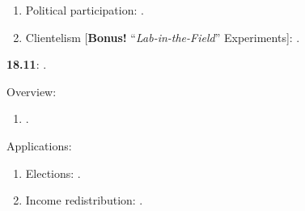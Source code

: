 \documentclass[letterpaper]{article}
\renewenvironment{itemize}{
  \begin{list}{}{
    \setlength{\leftmargin}{1.5em}
  }
}{
  \end{list}
}
\begin{document}
\begin{enumerate}
\begin{itemize}
\begin{enumerate}
           
          \item[$\bullet$] Political participation: \href{https://onlinelibrary.wiley.com/doi/pdf/10.1111/j.1540-5907.2008.00332.x}{}.

          \item[$\bullet$] Clientelism [{\bf Bonus!} ``\emph{Lab-in-the-Field}'' Experiments]: \href{https://doi.org/10.1177/0010414017695336}{}.


         \end{enumerate}

      \end{itemize}

  \item {\bf 18.11}:  {\color{ForestGreen}{\bf Natural Experiments}}.


      \begin{itemize} 

        \item[$\diamond$] Overview:

        \begin{enumerate}

          \item[$\bullet$] \href{https://www.cambridge.org/core/product/identifier/9781108777919%23c6/type/book_part}{\fullcite{Titiunik2021}}.

          \end{enumerate}

       \item[$\diamond$] Applications:

           \begin{enumerate}

           \item[$\bullet$] Elections: \href{https://doi.org/10.1111/pops.12940}{}.


           \item[$\bullet$] Income redistribution: \href{https://doi.org/10.1111/j.1467-9221.2006.00509.x}{}.


\end{enumerate}
\end{itemize}
\end{enumerate}
\end{document}
